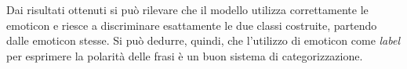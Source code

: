 \documentclass[a4paper,12pt,openright,twoside]{report}
\theoremstyle{definition}
\begin{document}
Dai risultati ottenuti si può rilevare che il modello utilizza correttamente le emoticon e 
riesce a discriminare
esattamente le due classi costruite, partendo dalle emoticon stesse. 
Si può dedurre, quindi, che l'utilizzo
di emoticon come \emph{label} per esprimere la polarità delle frasi è un buon sistema di categorizzazione.
\end{document}

